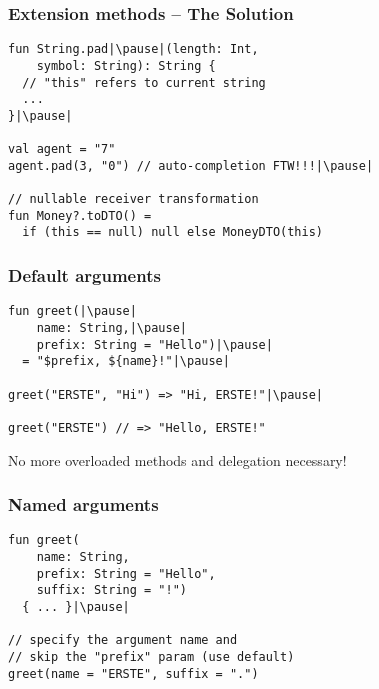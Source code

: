 \begin{frame}[fragile] \frametitle{Extension methods -- The Solution}
\pause
\begin{lstlisting}
fun String.pad|\pause|(length: Int,
    symbol: String): String {
  // "this" refers to current string
  ...
}|\pause|

val agent = "7"
agent.pad(3, "0") // auto-completion FTW!!!|\pause|

// nullable receiver transformation
fun Money?.toDTO() =
  if (this == null) null else MoneyDTO(this)
\end{lstlisting}
\end{frame}



\begin{frame}[fragile] \frametitle{Default arguments}
\pause
\begin{lstlisting}
fun greet(|\pause|
    name: String,|\pause|
    prefix: String = "Hello")|\pause|
  = "$prefix, ${name}!"|\pause|

greet("ERSTE", "Hi") => "Hi, ERSTE!"|\pause|

greet("ERSTE") // => "Hello, ERSTE!"
\end{lstlisting}

No more overloaded methods and delegation necessary!
\end{frame}


\begin{frame}[fragile] \frametitle{Named arguments}
\pause
\begin{lstlisting}
fun greet(
    name: String,
    prefix: String = "Hello",
    suffix: String = "!")
  { ... }|\pause|

// specify the argument name and
// skip the "prefix" param (use default)
greet(name = "ERSTE", suffix = ".")
\end{lstlisting}
\end{frame}


